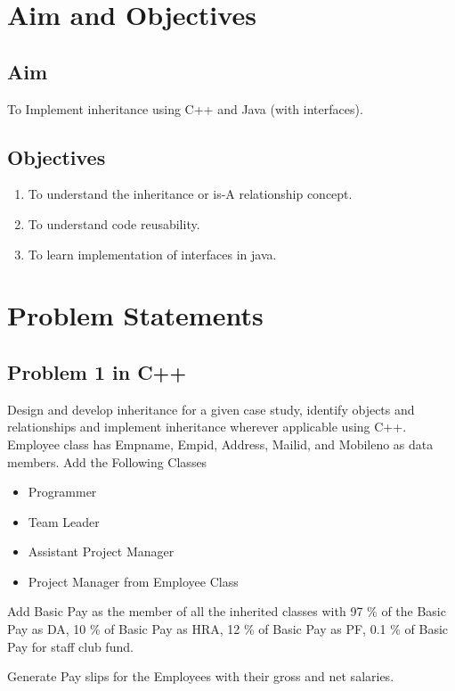 \documentclass[11pt]{article}
\begin{document}
\tableofcontents
\thispagestyle{empty}
\clearpage


\setcounter{page}{1}

\section{Aim and Objectives}
\subsection*{Aim}
To Implement inheritance using C++ and Java (with interfaces).
\subsection*{Objectives}
\begin{enumerate}
	\item To understand the inheritance or is-A relationship concept.
	\item To understand code reusability.
	\item To learn implementation of interfaces in java.
\end{enumerate}
\section{Problem Statements}
\subsection{Problem 1 in C++}

Design and develop inheritance for a given case study, identify objects and relationships
and implement inheritance wherever applicable using C++.\\
Employee class has Empname, Empid, Address, Mailid, and Mobileno as data
members.
Add the Following Classes
\begin{itemize}
	\item Programmer
	\item Team Leader
	\item Assistant Project Manager
	\item Project Manager from Employee Class
\end{itemize}
\noindent
Add Basic Pay as the member of all the inherited classes with 97 \% of the Basic Pay as DA, 10 \% of Basic Pay as HRA, 12 \% of  Basic Pay as PF, 0.1 \% of Basic Pay for staff club fund.

Generate Pay slips for the Employees with their gross and net salaries.
\end{document}
